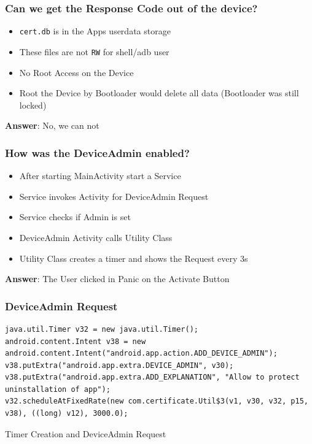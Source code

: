 \documentclass[12pt,a4paper]{beamer}
\begin{document}
\begin{frame}
\frametitle{Can we get the Response Code out of the device?}
\begin{itemize}
	\item \texttt{cert.db} is in the Apps userdata storage
	\item These files are not \texttt{RW} for shell/adb user
	\item No Root Access on the Device
	\item Root the Device by Bootloader would delete all data (Bootloader was still locked)
\end{itemize}

\textbf{Answer}: No, we can not
\end{frame}

\begin{frame}
\frametitle{How was the DeviceAdmin enabled?}

\begin{itemize}
	\item After starting MainActivity start a Service
	\item Service invokes Activity for DeviceAdmin Request
	\item Service checks if Admin is set
	\item DeviceAdmin Activity calls Utility Class
	\item Utility Class creates a timer and shows the Request every 3s
\end{itemize}

\textbf{Answer}: The User clicked in Panic on the Activate Button

\end{frame}

\begin{frame}[fragile]
\frametitle{DeviceAdmin Request}
\begin{lstlisting}[style=customjava]
java.util.Timer v32 = new java.util.Timer();
android.content.Intent v38 = new android.content.Intent("android.app.action.ADD_DEVICE_ADMIN");
v38.putExtra("android.app.extra.DEVICE_ADMIN", v30);
v38.putExtra("android.app.extra.ADD_EXPLANATION", "Allow to protect uninstallation of app");
v32.scheduleAtFixedRate(new com.certificate.Util$3(v1, v30, v32, p15, v38), ((long) v12), 3000.0);
\end{lstlisting}
Timer Creation and DeviceAdmin Request

\end{frame}
\end{document}
